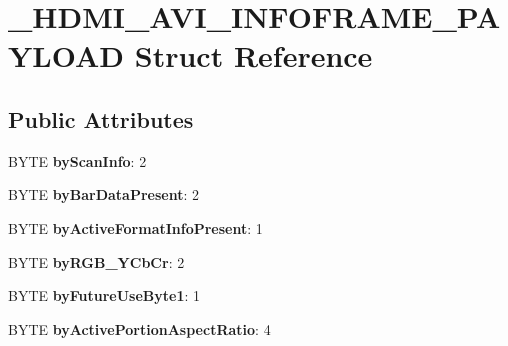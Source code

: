 \hypertarget{struct__HDMI__AVI__INFOFRAME__PAYLOAD}{\section{\-\_\-\-H\-D\-M\-I\-\_\-\-A\-V\-I\-\_\-\-I\-N\-F\-O\-F\-R\-A\-M\-E\-\_\-\-P\-A\-Y\-L\-O\-A\-D Struct Reference}
\label{struct__HDMI__AVI__INFOFRAME__PAYLOAD}
}
\subsection*{Public Attributes}
\begin{DoxyCompactItemize}
\item 
\hypertarget{struct__HDMI__AVI__INFOFRAME__PAYLOAD_aaf996645f00fea100122f384a0ca057a}{B\-Y\-T\-E {\bfseries by\-Scan\-Info}\-: 2}\label{struct__HDMI__AVI__INFOFRAME__PAYLOAD_aaf996645f00fea100122f384a0ca057a}

\item 
\hypertarget{struct__HDMI__AVI__INFOFRAME__PAYLOAD_afa2fccd92a71cdada46af4a1683581f2}{B\-Y\-T\-E {\bfseries by\-Bar\-Data\-Present}\-: 2}\label{struct__HDMI__AVI__INFOFRAME__PAYLOAD_afa2fccd92a71cdada46af4a1683581f2}

\item 
\hypertarget{struct__HDMI__AVI__INFOFRAME__PAYLOAD_a718e2ef37e2a73ce042ec6904aa0e5b7}{B\-Y\-T\-E {\bfseries by\-Active\-Format\-Info\-Present}\-: 1}\label{struct__HDMI__AVI__INFOFRAME__PAYLOAD_a718e2ef37e2a73ce042ec6904aa0e5b7}

\item 
\hypertarget{struct__HDMI__AVI__INFOFRAME__PAYLOAD_ad14a96e3beccc5760ed607409fb2d858}{B\-Y\-T\-E {\bfseries by\-R\-G\-B\-\_\-\-Y\-Cb\-Cr}\-: 2}\label{struct__HDMI__AVI__INFOFRAME__PAYLOAD_ad14a96e3beccc5760ed607409fb2d858}

\item 
\hypertarget{struct__HDMI__AVI__INFOFRAME__PAYLOAD_aaa2a906711d4f471da7dda2de0b06775}{B\-Y\-T\-E {\bfseries by\-Future\-Use\-Byte1}\-: 1}\label{struct__HDMI__AVI__INFOFRAME__PAYLOAD_aaa2a906711d4f471da7dda2de0b06775}

\item 
\hypertarget{struct__HDMI__AVI__INFOFRAME__PAYLOAD_a9985cc7c173476d4a570ad320759dc4d}{B\-Y\-T\-E {\bfseries by\-Active\-Portion\-Aspect\-Ratio}\-: 4}\label{struct__HDMI__AVI__INFOFRAME__PAYLOAD_a9985cc7c173476d4a570ad320759dc4d}


\end{DoxyCompactItemize}
